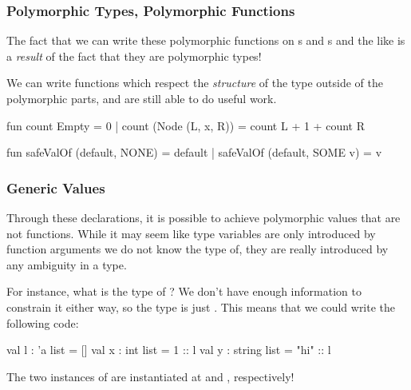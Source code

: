 \documentclass[aspectratio=169, handout]{beamer}
\begin{document}
\begin{frame}[fragile]
  \frametitle{Polymorphic Types, Polymorphic Functions}

  The fact that we can write these polymorphic functions on s and
  s and the like is a \textit{result} of the fact that they are
  polymorphic types!

  \pause
  \vspace{\fill}

  We can write functions which respect the \textit{structure} of the type
  outside of the polymorphic parts, and are still able to do useful work.

  \pause
  \vspace{\fill}

  \begin{codeblock}
    fun count Empty = 0
      | count (Node (L, x, R)) = count L + 1 + count R

    fun safeValOf (default, NONE)   = default
      | safeValOf (default, SOME v) = v
  \end{codeblock}
\end{frame}

\begin{frame}[fragile]
  \frametitle{Generic Values}

  Through these declarations, it is possible to achieve polymorphic values that
  are not functions. While it may seem like type variables are only introduced
  by function arguments we do not know the type of, they are really introduced by
  any ambiguity in a type.

  \pause
  \vspace{\fill}

  For instance, what is the type of \code{[]}? We don't have enough information 
  to constrain it either way, so the type is just . This means that
  we could write the following code: 

  \pause
  \vspace{\fill}

  \begin{codeblock}
    val l : 'a list = []
    val x : int list = 1 :: l
    val y : string list = "hi" :: l
  \end{codeblock}

  \pause
  The two instances of  are instantiated at  and 
  , respectively!
\end{frame}
\end{document}
